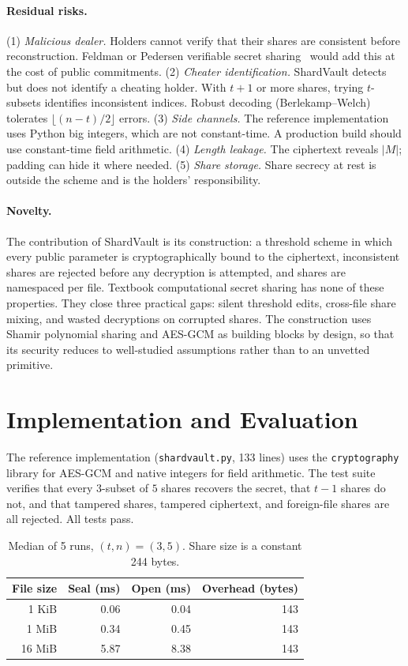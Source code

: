 \documentclass[11pt]{article}
\theoremstyle{definition}
\begin{document}
\paragraph{Residual risks.}
(1) \emph{Malicious dealer.} Holders cannot verify that their shares are consistent before reconstruction. Feldman or Pedersen verifiable secret sharing~\cite{feldman1987,pedersen1991} would add this at the cost of public commitments.
(2) \emph{Cheater identification.} ShardVault detects but does not identify a cheating holder. With $t+1$ or more shares, trying $t$-subsets identifies inconsistent indices. Robust decoding (Berlekamp--Welch) tolerates $\lfloor (n-t)/2 \rfloor$ errors.
(3) \emph{Side channels.} The reference implementation uses Python big integers, which are not constant-time. A production build should use constant-time field arithmetic.
(4) \emph{Length leakage.} The ciphertext reveals $|M|$; padding can hide it where needed.
(5) \emph{Share storage.} Share secrecy at rest is outside the scheme and is the holders' responsibility.

\paragraph{Novelty.} The contribution of ShardVault is its construction: a threshold scheme in which every public parameter is cryptographically bound to the ciphertext, inconsistent shares are rejected before any decryption is attempted, and shares are namespaced per file. Textbook computational secret sharing has none of these properties. They close three practical gaps: silent threshold edits, cross-file share mixing, and wasted decryptions on corrupted shares. The construction uses Shamir polynomial sharing and AES-GCM as building blocks by design, so that its security reduces to well-studied assumptions rather than to an unvetted primitive.

\section{Implementation and Evaluation}\label{sec:impl}
The reference implementation (\texttt{shardvault.py}, 133 lines) uses the \texttt{cryptography} library for AES-GCM and native integers for field arithmetic. The test suite verifies that every $3$-subset of $5$ shares recovers the secret, that $t-1$ shares do not, and that tampered shares, tampered ciphertext, and foreign-file shares are all rejected. All tests pass.

\begin{table}[h]
\centering\small
\begin{tabular}{rrrr}
\toprule
File size & Seal (ms) & Open (ms) & Overhead (bytes) \\
\midrule
1 KiB & 0.06 & 0.04 & 143 \\
1 MiB & 0.34 & 0.45 & 143 \\
16 MiB & 5.87 & 8.38 & 143 \\
\bottomrule
\end{tabular}
\caption{Median of 5 runs, $(t,n) = (3,5)$. Share size is a constant 244 bytes.}
\end{table}
\end{document}
